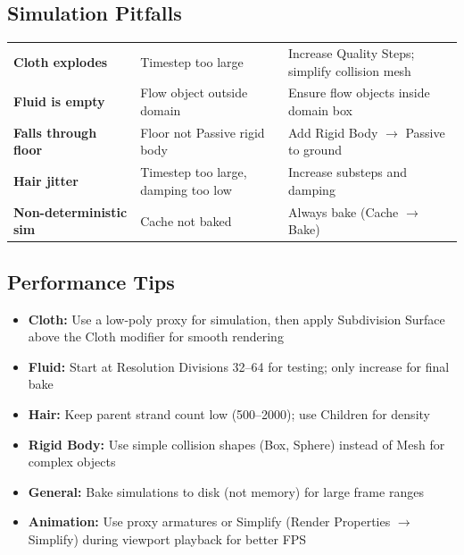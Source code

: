 \subsection{Simulation Pitfalls}

\begin{center}
\begin{tabularx}{\textwidth}{L{2.5cm}L{3.5cm}X}
\toprule
{}
 &  &  \\
\midrule
\textbf{Cloth explodes} & Timestep too large & Increase Quality Steps; simplify collision mesh \\
\textbf{Fluid is empty} & Flow object outside domain & Ensure flow objects inside domain box \\
\textbf{Falls through floor} & Floor not Passive rigid body & Add Rigid Body $\rightarrow$ Passive to ground \\
\textbf{Hair jitter} & Timestep too large, damping too low & Increase substeps and damping \\
\textbf{Non-deterministic sim} & Cache not baked & Always bake (Cache $\rightarrow$ Bake) \\
\bottomrule
\end{tabularx}
\end{center}

\subsection{Performance Tips}

\begin{itemize}[leftmargin=2em]
  \item \textbf{Cloth:} Use a low-poly proxy for simulation, then apply Subdivision Surface above the Cloth modifier for smooth rendering
  \item \textbf{Fluid:} Start at Resolution Divisions 32--64 for testing; only increase for final bake
  \item \textbf{Hair:} Keep parent strand count low (500--2000); use Children for density
  \item \textbf{Rigid Body:} Use simple collision shapes (Box, Sphere) instead of Mesh for complex objects
  \item \textbf{General:} Bake simulations to disk (not memory) for large frame ranges
  \item \textbf{Animation:} Use proxy armatures or Simplify (Render Properties $\rightarrow$ Simplify) during viewport playback for better FPS
\end{itemize}


